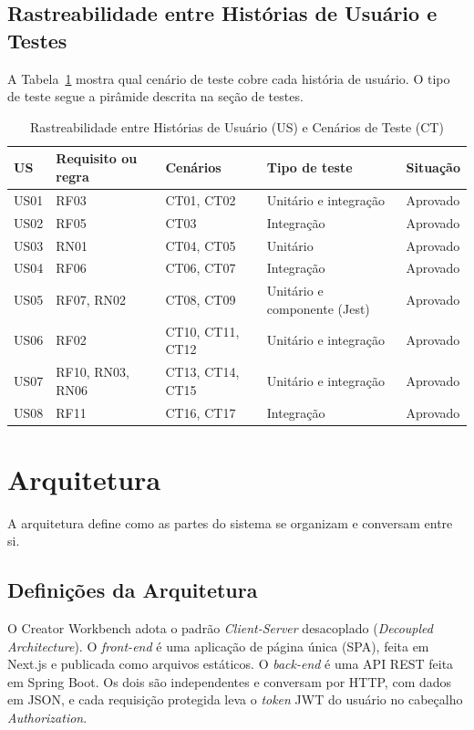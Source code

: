 \subsection{Rastreabilidade entre Histórias de Usuário e Testes}

A Tabela~\ref{tab:rastreabilidade} mostra qual cenário de teste cobre cada história de usuário. O tipo de teste segue a pirâmide descrita na seção de testes.

\begin{table}[H]
\centering
\caption{Rastreabilidade entre Histórias de Usuário (US) e Cenários de Teste (CT)}
\label{tab:rastreabilidade}
\small
\begin{tabular}{|p{1.2cm}|p{2.8cm}|p{2.6cm}|p{3.4cm}|p{2.6cm}|}
\hline
\textbf{US} & \textbf{Requisito ou regra} & \textbf{Cenários} & \textbf{Tipo de teste} & \textbf{Situação} \\
\hline
US01 & RF03 & CT01, CT02 & Unitário e integração & Aprovado \\
\hline
US02 & RF05 & CT03 & Integração & Aprovado \\
\hline
US03 & RN01 & CT04, CT05 & Unitário & Aprovado \\
\hline
US04 & RF06 & CT06, CT07 & Integração & Aprovado \\
\hline
US05 & RF07, RN02 & CT08, CT09 & Unitário e componente (Jest) & Aprovado \\
\hline
US06 & RF02 & CT10, CT11, CT12 & Unitário e integração & Aprovado \\
\hline
US07 & RF10, RN03, RN06 & CT13, CT14, CT15 & Unitário e integração & Aprovado \\
\hline
US08 & RF11 & CT16, CT17 & Integração & Aprovado \\
\hline
\end{tabular}
\end{table}

\section{Arquitetura}

A arquitetura define como as partes do sistema se organizam e conversam entre si.

\subsection{Definições da Arquitetura}

O Creator Workbench adota o padrão \textit{Client-Server} desacoplado (\textit{Decoupled Architecture}). O \textit{front-end} é uma aplicação de página única (SPA), feita em Next.js e publicada como arquivos estáticos. O \textit{back-end} é uma API REST feita em Spring Boot. Os dois são independentes e conversam por HTTP, com dados em JSON, e cada requisição protegida leva o \textit{token} JWT do usuário no cabeçalho \textit{Authorization}.

